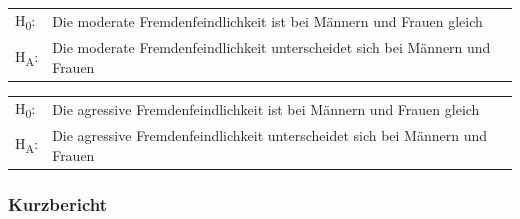 \documentclass[]{article}
\newenvironment{Shaded}{\begin{snugshade}}{\end{snugshade}}
\newcommand{\KeywordTok}[1]{\textcolor[rgb]{0.13,0.29,0.53}{\textbf{{#1}}}}
\newcommand{\DataTypeTok}[1]{\textcolor[rgb]{0.13,0.29,0.53}{{#1}}}
\newcommand{\StringTok}[1]{\textcolor[rgb]{0.31,0.60,0.02}{{#1}}}
\newcommand{\NormalTok}[1]{{#1}}
\begin{document}
\begin{longtable}[]{@{}ll@{}}
\toprule
\begin{minipage}[t]{0.12\columnwidth}\raggedright\strut
H\textsubscript{0}:\strut
\end{minipage} & \begin{minipage}[t]{0.82\columnwidth}\raggedright\strut
Die moderate Fremdenfeindlichkeit ist bei Männern und Frauen
gleich\strut
\end{minipage}\tabularnewline
\begin{minipage}[t]{0.12\columnwidth}\raggedright\strut
H\textsubscript{A}:\strut
\end{minipage} & \begin{minipage}[t]{0.82\columnwidth}\raggedright\strut
Die moderate Fremdenfeindlichkeit unterscheidet sich bei Männern und
Frauen\strut
\end{minipage}\tabularnewline
\bottomrule
\end{longtable}

\begin{longtable}[]{@{}ll@{}}
\toprule
\begin{minipage}[t]{0.12\columnwidth}\raggedright\strut
H\textsubscript{0}:\strut
\end{minipage} & \begin{minipage}[t]{0.82\columnwidth}\raggedright\strut
Die agressive Fremdenfeindlichkeit ist bei Männern und Frauen
gleich\strut
\end{minipage}\tabularnewline
\begin{minipage}[t]{0.12\columnwidth}\raggedright\strut
H\textsubscript{A}:\strut
\end{minipage} & \begin{minipage}[t]{0.82\columnwidth}\raggedright\strut
Die agressive Fremdenfeindlichkeit unterscheidet sich bei Männern und
Frauen\strut
\end{minipage}\tabularnewline
\bottomrule
\end{longtable}

\subsubsection{Kurzbericht}\label{kurzbericht-3}

\begin{Shaded}
\end{Shaded}
\end{document}
